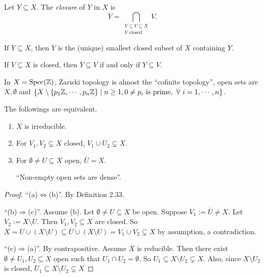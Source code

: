 \begin{definition}
    Let $Y \subseteq X$. The \emph{closure} of $Y$ in $X$ is 
    \[\overbar Y = \bigcap_{\substack{Y \subseteq V \subseteq X \\ V \text{ closed}}}V.\]
\end{definition}

\begin{fact}
    If $Y \subseteq X$, then $\overbar Y$ is the (unique) smallest closed subset of $X$ containing $Y$. \par 
    If $V \subseteq X$ is closed, then $\overbar Y \subseteq V$ if and only if $Y \subseteq V$.
\end{fact}

\begin{example*}
    In $X = \operatorname{Spec}(\mathbb{Z})$, Zariski topology is almost the ``cofinite topology'', open sets are $X,\emptyset$ and $\{X \setminus \{p_1\mathbb{Z},\cdots,p_n\mathbb{Z}\} \mid n \geq 1, 0 \neq p_i \text{ is prime},\ \forall \  i = 1,\cdots,n\}$.
\end{example*}

\begin{lemma}
    The followings are equivalent.
    \begin{enumerate}
        \item $X$ is irreducible.
        \item For $V_1,V_2 \subsetneq X$ closed, $V_1 \cup U_2 \subsetneq X$.
        \item For $\emptyset \neq U \subseteq X$ open, $\overbar U = X$. \par 
            ``Non-empty open sets are dense''.
    \end{enumerate}
\end{lemma}

\begin{proof}
    ``(a)$\Leftrightarrow$(b)''. By Definition 2.33. \par 
    ``(b)$\Rightarrow$(c)''. Assume (b). Let $\emptyset \neq U \subseteq X$ be open. Suppose $V_1 := \overbar U \neq X$. Let $V_2 := X \setminus U$. Then $V_1,V_2 \subseteq X$ are closed. So $X = U \cup (X \setminus U) \subseteq \overbar U \cup (X \setminus U) = V_1 \cup V_2 \subsetneq X$ by assumption, a contradiction. \par 
    ``(c)$\Rightarrow$(a)''. By contrapositive. Assume $X$ is reducible. Then there exist $\emptyset \neq U_1,U_2 \subseteq X$ open such that $U_1 \cap U_2 = \emptyset$. So $U_1 \subseteq X \setminus U_2 \subsetneq X$. Also, since $X \setminus U_2$ is closed, $\overbar U_1 \subseteq X \setminus U_2 \subsetneq X$
\end{proof}

